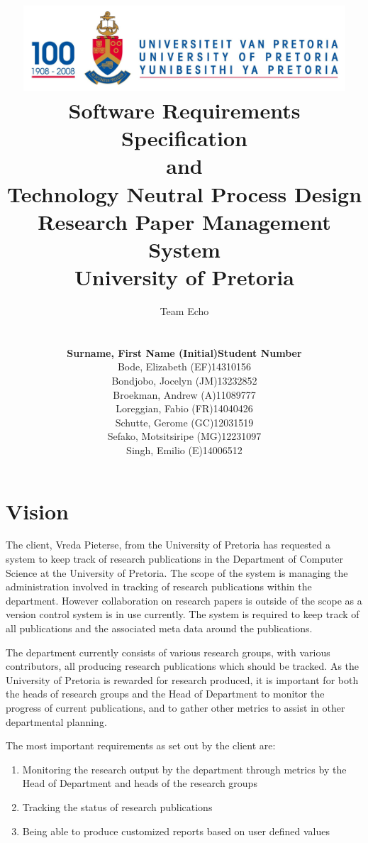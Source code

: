 \documentclass[a4paper,10pt]{article}
\title{\includegraphics[width=12cm]{Eeufeeslogo.jpg} \\
       Software Requirements Specification \\ 
       and \\
       Technology Neutral Process Design \\
       Research Paper Management System \\
       \vspace{0.5cm}
       University of Pretoria \\
       \vspace{1.0cm}
       }
\date{}
\author{Team Echo\\
	\vspace{0.5cm} \\
	\begin{tabu} to \textwidth { X[l] X[l]}
		\hline
		\textbf{Surname, First Name (Initial)}	& \textbf{Student Number}	\\ \hline \hline
		Bode, Elizabeth (EF)			& 14310156		\\ \hline
		Bondjobo, Jocelyn (JM)		& 13232852		\\ \hline
		Broekman, Andrew (A)		& 11089777		\\ \hline
		Loreggian, Fabio (FR)			& 14040426		\\ \hline
		Schutte, Gerome (GC)		& 12031519		\\ \hline
		Sefako, Motsitsiripe (MG)		& 12231097		\\ \hline
		Singh, Emilio (E)			& 14006512		\\ \hline
		\hline
	\end{tabu}}
\begin{document}
\maketitle
\thispagestyle{empty}
\clearpage

\newpage
{}
\thispagestyle{empty}
\tableofcontents
\clearpage

\newpage
{}

\section{Vision}
The client, Vreda Pieterse, from the University of Pretoria has requested a system to keep track of research publications in the Department of Computer Science at the University of Pretoria. The scope of the system is managing the administration involved in tracking of research publications within the department. However collaboration on research papers is outside of the scope as a version control system is in use currently. The system is required to keep track of all publications and the associated meta data around the publications.

The department currently consists of various research groups, with various contributors, all producing research publications which should be tracked. As the University of Pretoria is rewarded for research produced, it is important for both the heads of research groups and the Head of Department to monitor the progress of current publications, and to gather other metrics to assist in other departmental planning.

The most important requirements as set out by the client are:
\begin{enumerate}
\item Monitoring the research output by the department through metrics by the Head of Department and heads of the research groups
\item Tracking the status of research publications
\item Being able to produce customized reports based on user defined values
\end{enumerate}
\end{document}
